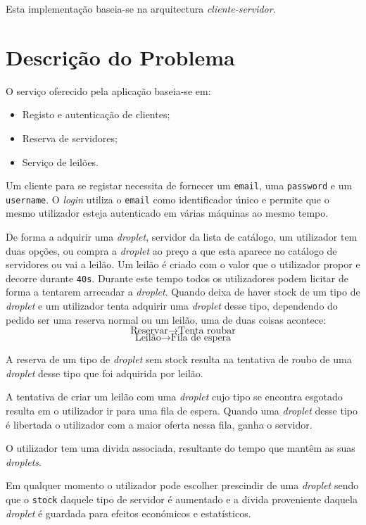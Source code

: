 \documentclass[a4paper]{article}
\begin{document}
Esta implementação baseia-se na arquitectura \textit{cliente-servidor}.


\section{Descrição do Problema}
O serviço oferecido pela aplicação baseia-se em:
\begin{itemize}
  \item Registo e autenticação de clientes;
  \item Reserva de servidores;
  \item Serviço de leilões.
\end{itemize}

Um cliente para se registar necessita de fornecer um \texttt{email}, uma \texttt{password} e um \texttt{username}. O \textit{login} utiliza o \texttt{email} como identificador único e permite que o mesmo utilizador esteja autenticado em várias máquinas ao mesmo tempo.

De forma a adquirir uma \textit{droplet}, servidor da lista de catálogo, um utilizador tem duas opções, ou compra a \textit{droplet} ao preço a que esta aparece no catálogo de servidores ou vai a leilão. Um leilão é criado com o valor que o utilizador propor e decorre durante \texttt{40s}. Durante este tempo todos os utilizadores podem licitar de forma a tentarem arrecadar a \textit{droplet}.
Quando deixa de haver stock de um tipo de \textit{droplet} e um utilizador tenta adquirir uma \textit{droplet} desse tipo, dependendo do pedido ser uma reserva normal ou um leilão, uma de duas coisas acontece:
$$\textrm{Reservar} \rightarrow \textrm{Tenta roubar}$$
$$\textrm{Leilão} \rightarrow \textrm{Fila de espera}$$


A reserva de um tipo de \textit{droplet} sem stock resulta na tentativa de roubo de uma \textit{droplet} desse tipo que foi adquirida por leilão.

A tentativa de criar um leilão com uma \textit{droplet} cujo tipo se encontra esgotado resulta em o utilizador ir para uma fila de espera. Quando uma \textit{droplet} desse tipo é libertada o utilizador com a maior oferta nessa fila, ganha o servidor. 

O utilizador tem uma divida associada, resultante do tempo que mantêm as suas \textit{droplets}.

Em qualquer momento o utilizador pode escolher prescindir de uma \textit{droplet} sendo que o \texttt{stock} daquele tipo de servidor é aumentado e a divida proveniente daquela \textit{droplet} é guardada para efeitos económicos e estatísticos.
\end{document}
